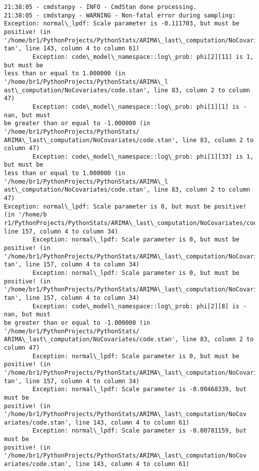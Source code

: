 \documentclass[11pt]{article}
\begin{document}
    \begin{Verbatim}[commandchars=\\\{\}]
21:38:05 - cmdstanpy - INFO - CmdStan done processing.
21:38:05 - cmdstanpy - WARNING - Non-fatal error during sampling:
Exception: normal\_lpdf: Scale parameter is -0.111703, but must be positive! (in 
'/home/br1/PythonProjects/PythonStats/ARIMA\_last\_computation/NoCovariates/code.s
tan', line 143, column 4 to column 61)
        Exception: code\_model\_namespace::log\_prob: phi[2][11] is 1, but must be
less than or equal to 1.000000 (in '/home/br1/PythonProjects/PythonStats/ARIMA\_l
ast\_computation/NoCovariates/code.stan', line 83, column 2 to column 47)
        Exception: code\_model\_namespace::log\_prob: phi[1][1] is -nan, but must
be greater than or equal to -1.000000 (in '/home/br1/PythonProjects/PythonStats/
ARIMA\_last\_computation/NoCovariates/code.stan', line 83, column 2 to column 47)
        Exception: code\_model\_namespace::log\_prob: phi[1][33] is 1, but must be
less than or equal to 1.000000 (in '/home/br1/PythonProjects/PythonStats/ARIMA\_l
ast\_computation/NoCovariates/code.stan', line 83, column 2 to column 47)
Exception: normal\_lpdf: Scale parameter is 0, but must be positive! (in '/home/b
r1/PythonProjects/PythonStats/ARIMA\_last\_computation/NoCovariates/code.stan',
line 157, column 4 to column 34)
        Exception: normal\_lpdf: Scale parameter is 0, but must be positive! (in 
'/home/br1/PythonProjects/PythonStats/ARIMA\_last\_computation/NoCovariates/code.s
tan', line 157, column 4 to column 34)
        Exception: normal\_lpdf: Scale parameter is 0, but must be positive! (in 
'/home/br1/PythonProjects/PythonStats/ARIMA\_last\_computation/NoCovariates/code.s
tan', line 157, column 4 to column 34)
        Exception: code\_model\_namespace::log\_prob: phi[2][8] is -nan, but must
be greater than or equal to -1.000000 (in '/home/br1/PythonProjects/PythonStats/
ARIMA\_last\_computation/NoCovariates/code.stan', line 83, column 2 to column 47)
        Exception: normal\_lpdf: Scale parameter is 0, but must be positive! (in 
'/home/br1/PythonProjects/PythonStats/ARIMA\_last\_computation/NoCovariates/code.s
tan', line 157, column 4 to column 34)
        Exception: normal\_lpdf: Scale parameter is -0.00468339, but must be
positive! (in '/home/br1/PythonProjects/PythonStats/ARIMA\_last\_computation/NoCov
ariates/code.stan', line 143, column 4 to column 61)
        Exception: normal\_lpdf: Scale parameter is -0.00781159, but must be
positive! (in '/home/br1/PythonProjects/PythonStats/ARIMA\_last\_computation/NoCov
ariates/code.stan', line 143, column 4 to column 61)

\end{Verbatim}
\end{document}
